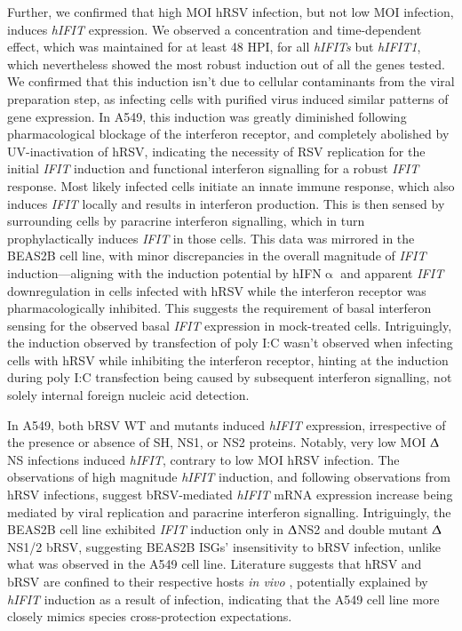 Further, we confirmed that high MOI hRSV infection, but not low MOI infection, induces \textit{hIFIT} expression. We observed a concentration and time-dependent effect, which was maintained for at least 48 HPI, for all \textit{hIFITs} but \textit{hIFIT1}, which nevertheless showed the most robust induction out of all the genes tested. We confirmed that this induction isn't due to cellular contaminants from the viral preparation step, as infecting cells with purified virus induced similar patterns of gene expression. In A549, this induction was greatly diminished following pharmacological blockage of the interferon receptor, and completely abolished by UV-inactivation of hRSV, indicating the necessity of RSV replication for the initial \textit{IFIT} induction and functional interferon signalling for a robust \textit{IFIT} response. Most likely infected cells initiate an innate immune response, which also induces \textit{IFIT} locally and results in interferon production. This is then sensed by surrounding cells by paracrine interferon signalling, which in turn prophylactically induces \textit{IFIT} in those cells. This data was mirrored in the BEAS2B cell line, with minor discrepancies in the overall magnitude of \textit{IFIT} induction—aligning with the induction potential by hIFN$\upalpha$ and apparent \textit{IFIT} downregulation in cells infected with hRSV while the interferon receptor was pharmacologically inhibited. This suggests the requirement of basal interferon sensing for the observed basal \textit{IFIT} expression in mock-treated cells. Intriguingly, the induction observed by transfection of poly I:C wasn't observed when infecting cells with hRSV while inhibiting the interferon receptor, hinting at the induction during poly I:C transfection being caused by subsequent interferon signalling, not solely internal foreign nucleic acid detection.

In A549, both bRSV WT and mutants induced \textit{hIFIT} expression, irrespective of the presence or absence of SH, NS1, or NS2 proteins. Notably, very low MOI $\Updelta$NS infections induced \textit{hIFIT}, contrary to low MOI hRSV infection. The observations of high magnitude \textit{hIFIT} induction, and following observations from hRSV infections, suggest bRSV-mediated \textit{hIFIT} mRNA expression increase being mediated by viral replication and paracrine interferon signalling. Intriguingly, the BEAS2B cell line exhibited \textit{IFIT} induction only in $\Updelta$NS2 and double mutant $\Updelta$NS1/2 bRSV, suggesting BEAS2B ISGs' insensitivity to bRSV infection, unlike what was observed in the A549 cell line. Literature suggests that hRSV and bRSV are confined to their respective hosts \textit{in vivo} \cite{Buchholz2000ChimericVaccine}, potentially explained by \textit{hIFIT} induction as a result of infection, indicating that the A549 cell line more closely mimics species cross-protection expectations.

